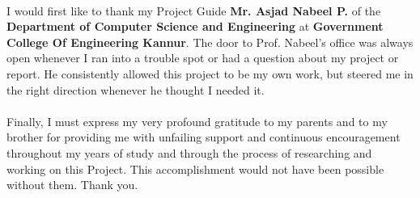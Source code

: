 \thispagestyle{plain}
\paragraph{}I would first like to thank my Project Guide \textbf{Mr. Asjad Nabeel P.} of the \textbf{Department of Computer Science and Engineering} at \textbf{Government College Of Engineering Kannur}. The door to Prof. Nabeel's office was always open whenever I ran into a trouble spot or had a question about my project or report. He consistently allowed this project to be my own work, but steered me in the right direction whenever he thought I needed it.
\paragraph{} Finally, I must express my very profound gratitude to my parents and to my brother for providing me with unfailing support and continuous encouragement throughout my years of study and through the process of researching and working on this Project. This accomplishment would not have been possible without them. Thank you.
